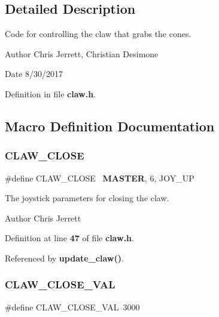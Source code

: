 \subsection{Detailed Description}
Code for controlling the claw that grabs the cones. 

\begin{DoxyAuthor}{Author}
Chris Jerrett, Christian Desimone 
\end{DoxyAuthor}
\begin{DoxyDate}{Date}
8/30/2017 
\end{DoxyDate}


Definition in file \textbf{ claw.\+h}.



\subsection{Macro Definition Documentation}
\mbox{\label{claw_8h_af2a18397e9efae0be9470a76797b2077}} 
\subsubsection{C\+L\+A\+W\+\_\+\+C\+L\+O\+SE}
{\footnotesize\ttfamily \#define C\+L\+A\+W\+\_\+\+C\+L\+O\+SE~\textbf{ M\+A\+S\+T\+ER}, 6, J\+O\+Y\+\_\+\+UP}



The joystick parameters for closing the claw. 

\begin{DoxyAuthor}{Author}
Chris Jerrett 
\end{DoxyAuthor}


Definition at line \textbf{ 47} of file \textbf{ claw.\+h}.



Referenced by \textbf{ update\+\_\+claw()}.

\mbox{\label{claw_8h_a78d3e6f3d4b60e1be137fdc6dd144224}} 
\subsubsection{C\+L\+A\+W\+\_\+\+C\+L\+O\+S\+E\+\_\+\+V\+AL}
{\footnotesize\ttfamily \#define C\+L\+A\+W\+\_\+\+C\+L\+O\+S\+E\+\_\+\+V\+AL~3000}



